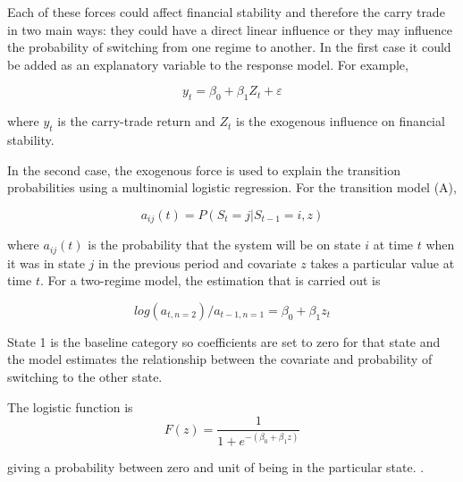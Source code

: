 \documentclass[12pt, a4paper, oneside]{article}\usepackage[]{graphicx}\usepackage[]{color}
\begin{document}
Each of these forces could affect financial stability and therefore the carry trade in two main ways:  they could have a direct linear influence or they may influence the probability of switching from one regime to another.  In the first case it could be added as an explanatory variable to the response model. For example, 

\begin{equation}
\label{eqref:vix}
y_t = \beta_0 + \beta_1 Z_t + \varepsilon
\end{equation}

where $y_t$ is the carry-trade return and $Z_t$ is the exogenous influence on financial stability. 

In the second case, the exogenous force is used to explain the transition probabilities using a multinomial logistic regression. For the transition model (A), 

\begin{equation}
a_{ij}(t) = P(S_t = j|S_{t-1} = i, z)
\end{equation}

where $a_{ij}(t)$ is the probability that the system will be on state $i$ at time $t$ when it was in state $j$ in the previous period and covariate $z$ takes a particular value at time $t$.  For a two-regime model, the  estimation that is carried out is 

\begin{equation}
log(a_{t,n = 2})/ a_{t-1, n = 1} = \beta_{0} +\beta_1 z_t 
\end{equation}

State 1 is the baseline category so coefficients are set to zero for that state and the model estimates the relationship between the covariate and probability of switching to the other state. 

The logistic function is 
\begin{equation} 
F(z)  = \frac{1}{1 + e^{-(\beta_0 + \beta_1 z)}}
\label{eqref:zcov}
\end{equation}
 
giving a probability between zero and unit of being in the particular state. \citet[pp.174-75]{agresti2014categorical}. 
\end{document}

